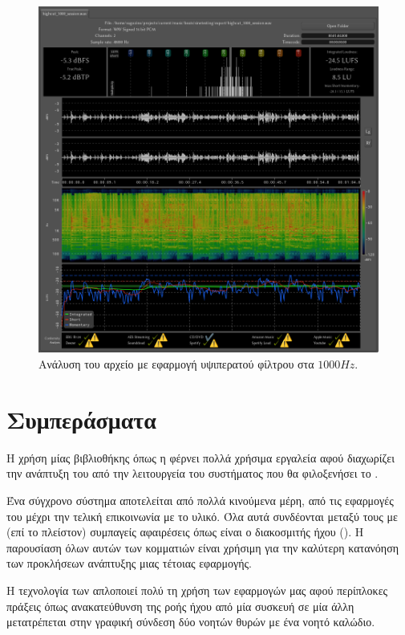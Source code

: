 \documentclass[12pt]{extarticle}
\begin{document}
\begin{figure}[htpb]
    \centering
    \includegraphics[width=\textwidth]{./assets/session_1000_hp.png}
    \caption{Ανάλυση του αρχείο  με εφαρμογή υψιπερατού φίλτρου στα $1000Hz$.}
    \label{fig:sessionanalysishp1000}
\end{figure}

\fi

\section{Συμπεράσματα}

Η χρήση μίας βιβλιοθήκης όπως η  φέρνει πολλά χρήσιμα εργαλεία 
αφού διαχωρίζει την ανάπτυξη του  από την λειτουργεία του συστήματος που 
θα φιλοξενήσει το . 

Ένα σύγχρονο σύστημα αποτελείται από πολλά κινούμενα μέρη, από τις εφαρμογές 
του μέχρι την τελική επικοινωνία με το υλικό. Όλα αυτά συνδέονται μεταξύ τους
με (επί το πλείστον) συμπαγείς αφαιρέσεις όπως είναι ο διακοσμιτής ήχου ().
Η παρουσίαση όλων αυτών των κομματιών είναι χρήσιμη για την καλύτερη κατανόηση 
των προκλήσεων ανάπτυξης μιας τέτοιας εφαρμογής.

Η τεχνολογία των  απλοποιεί πολύ 
τη χρήση των εφαρμογών μας αφού περίπλοκες πράξεις όπως ανακατεύθυνση της 
ροής ήχου από μία συσκευή σε μία άλλη μετατρέπεται στην γραφική σύνδεση
δύο νοητών θυρών με ένα νοητό καλώδιο.

\newpage


\end{document}
